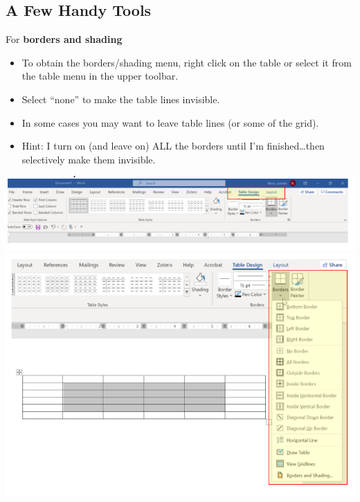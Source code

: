 \documentclass[
  english,
]{book}
\providecommand{\tightlist}{%
  \setlength{\itemsep}{0pt}\setlength{\parskip}{0pt}}
\begin{document}
\hypertarget{a-few-handy-tools}{%
\subsection{A Few Handy Tools}\label{a-few-handy-tools}}

For \textbf{borders and shading}

\begin{itemize}
\tightlist
\item
  To obtain the borders/shading menu, right click on the table or select it from the table menu in the upper toolbar.
\item
  Select ``none'' to make the table lines invisible.
\item
  In some cases you may want to leave table lines (or some of the grid).
\item
  Hint: I turn on (and leave on) ALL the borders until I'm finished\ldots then selectively make them invisible.
\end{itemize}

\includegraphics{images/TableMagic/TableDesign.png}
\includegraphics{images/TableMagic/TableDesign1.png}
\end{document}

